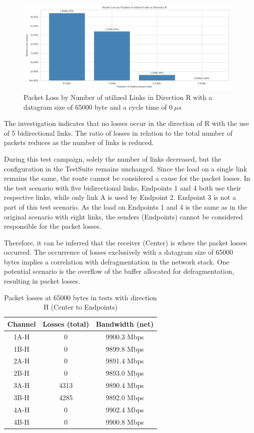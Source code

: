 \documentclass[	a4paper,
				11pt,
				DIV=11,
				bigheadings,
				idxtotoc,
				listof=totoc,	
				bibtotoc,		
				halfparskip,
				cleardoubleempty,
				oneside,
				openright]{scrartcl}
\begin{document}
\begin{figure}[h]
	\includegraphics[width=\textwidth]{fig4.png}
	\centering
	\caption{Packet Loss by Number of utilized Links in Direction R with a datagram size of 65000 byte and a cycle time of \( 0\ \mu s \)   }
    \label{fig:fig4}
\end{figure}

The investigation indicates that no losses occur in the direction of R with the use of 5 bidirectional links. The ratio of losses in relation to the total number of packets reduces as the number of links is reduced.

During this test campaign, solely the number of links decreased, but the configuration in the TestSuite remains unchanged. Since the load on a single link remains the same, the route cannot be considered a cause for the packet losses. In the test scenario with five bidirectional links, Endpoints 1 and 4 both use their respective links, while only link A is used by Endpoint 2. Endpoint 3 is not a part of this test scenario. As the load on Endpoints 1 and 4 is the same as in the original scenario with eight links, the senders (Endpoints) cannot be considered responsible for the packet losses.

Therefore, it can be inferred that the receiver (Center) is where the packet losses occurred. The occurrence of losses exclusively with a datagram size of 65000 bytes implies a correlation with defragmentation in the network stack. One potential scenario is the overflow of the buffer allocated for defragmentation, resulting in packet losses.


\begin{table}[h]
\centering
\begin{tabular}{||c c c||} 
 \hline
 Channel & Losses (total) & Bandwidth (net) \\ [0.5ex] 
 \hline\hline
 1A-H & 0    & 9900.3 Mbps \\ 
 1B-H & 0    & 9899.8 Mbps \\
 2A-H & 0    & 9891.4 Mbps \\
 2B-H & 0    & 9893.0 Mbps \\
 3A-H & 4313 & 9890.4 Mbps \\
 3B-H & 4285 & 9892.0 Mbps \\
 4A-H & 0    & 9902.4 Mbps \\
 4B-H & 0    & 9900.8 Mbps \\ [1ex] 
 \hline
\end{tabular}
\caption{ Packet losses at 65000 bytes in tests with direction H (Center to Endpoints)}
\label{table:2}
\end{table}
\end{document}

